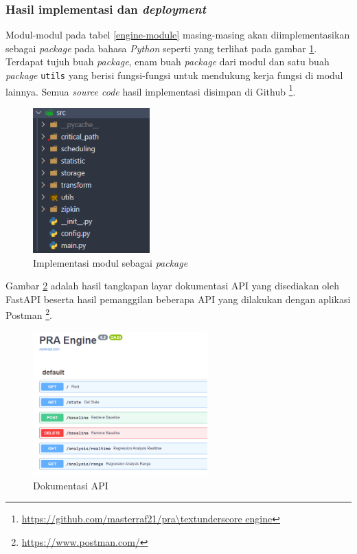 %	
%	
%	


\subsubsection{Hasil implementasi dan \textit{deployment}}
Modul-modul pada tabel \ref{engine-module} masing-masing akan diimplementasikan sebagai \textit{package} pada bahasa \textit{Python} seperti yang terlihat pada gambar \ref{package}. Terdapat tujuh buah \textit{package}, enam buah \textit{package} dari modul dan satu buah \textit{package} \texttt{utils} yang berisi fungsi-fungsi untuk mendukung kerja fungsi di modul lainnya. Semua \textit{source code} hasil implementasi disimpan di Github \footnote{\url{https://github.com/masterraf21/pra\textunderscore engine}}.
\begin{figure}[!htb]
	\centering
	\includegraphics[width=0.4\textwidth]{resources/ch4/packages.png}
	\caption{Implementasi modul sebagai \textit{package}}
	\label{package}
\end{figure} 

Gambar \ref{api_docs} adalah hasil tangkapan layar dokumentasi API yang disediakan oleh FastAPI beserta hasil pemanggilan beberapa API yang dilakukan dengan aplikasi Postman \footnote{\url{https://www.postman.com/}}.
\begin{figure}[!htb]
	\centering
	\includegraphics[width=0.6\textwidth]{resources/ch4/api_docs.png}
	\caption{Dokumentasi API}
	\label{api_docs}
\end{figure} 

